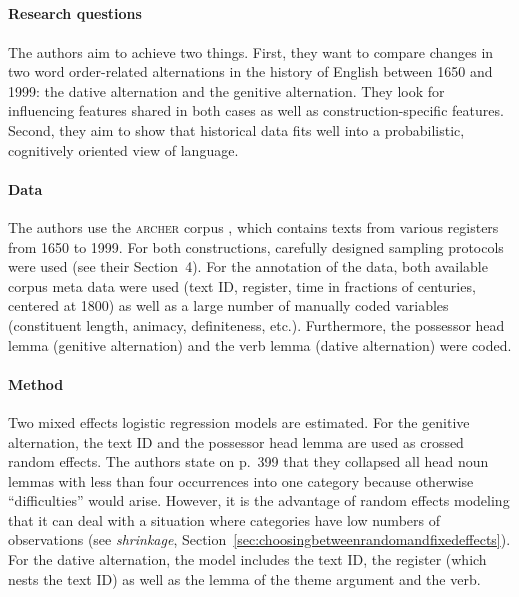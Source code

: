 \begin{mdframed}
  \subsection*{\citet{WolkEa2013}}
  
  \paragraph{Research questions}

  The authors aim to achieve two things.
  First, they want to compare changes in two word order-related alternations in the history of English between 1650 and 1999: the dative alternation and the genitive alternation.
  They look for influencing features shared in both cases as well as construction-specific features.
  Second, they aim to show that historical data fits well into a probabilistic, cognitively oriented view of language.

  \paragraph{Data}

  The authors use the \textsc{archer} corpus \citep{BiberEa1994}, which contains texts from various registers from 1650 to 1999.
  For both constructions, carefully designed sampling protocols were used (see their Section~4).
  For the annotation of the data, both available corpus meta data were used (text ID, register, time in fractions of centuries, centered at 1800) as well as a large number of manually coded variables (constituent length, animacy, definiteness, etc.).
  Furthermore, the possessor head lemma (genitive alternation) and the verb lemma (dative alternation) were coded.

  \paragraph{Method}

  Two mixed effects logistic regression models are estimated.
  For the genitive alternation, the text ID and the possessor head lemma are used as crossed random effects.
  The authors state on p.~399 that they collapsed all head noun lemmas with less than four occurrences into one category because otherwise ``difficulties'' would arise.
  However, it is the advantage of random effects modeling that it can deal with a situation where categories have low numbers of observations (see \textit{shrinkage}, Section~\ref{sec:choosingbetweenrandomandfixedeffects}).
  For the dative alternation, the model includes the text ID, the register (which nests the text ID) as well as the lemma of the theme argument and the verb. 


\end{mdframed}
